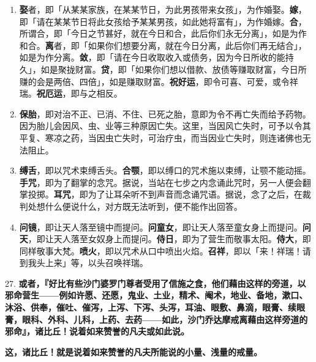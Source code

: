 \begin{enumerate}\item \textbf{娶}者，即「从某某家族，在某某节日，为此男孩带来女孩」，为作婚娶。\textbf{嫁}，即「请在某某节日将此女孩给予某某男孩，如此她将富有」，为作婚嫁。\textbf{合}，所谓合，即「今日之节甚好，就在今日和合，此后你们永无分离」，如是为作和合。\textbf{离}者，即「如果你们想要分离，就在今日分离，此后你们再无结合」，如是为作分离。\textbf{敛}，即「请在今日收取收入或债务，因为今日所收的能持久」，如是聚拢财富。\textbf{贷}，即「如果你们想以借款、放债等赚取财富，今日所赚的会是两倍、四倍」，如是赚取财富。\textbf{祝好运}，即令可喜、可爱，或令祥瑞。\textbf{祝厄运}，即与之相反。
\item \textbf{保胎}，即对治不正、已消、不住、已死之胎，意即为令不再亡失而给予药物。因为胎儿会因风、虫、业等三种原因亡失。这里，当因风亡失时，可予以令其平复、寒凉之药，当因虫亡失时，可治疗虫，而当因业亡失时，则连诸佛也无法阻止。
\item \textbf{缚舌}，即以咒术束缚舌头。\textbf{合颚}，即以缚口的咒术施以束缚，让颚不能动摇。\textbf{手咒}，即为了翻掌的念咒。据说，当站在七步之内念诵此咒时，另一人便会翻掌投掷。\textbf{耳咒}，即为了让耳朵听不到声音而念诵咒语。据说，念了之后，在裁判处想什么便说什么，对方既无法听到，便不能作出回答。
\item \textbf{问镜}，即让天人落至镜中而提问。\textbf{问童女}，即让天人落至童女身上而提问。\textbf{问天}，即让天人落至女奴身上而提问。\textbf{侍日}，即为了营生而敬事太阳。\textbf{侍大}，即同样敬事大梵。\textbf{喷火}，即以咒术从口中喷出火焰。\textbf{召祥}，即以「来！祥瑞！请到我头上来」等，以头召唤祥瑞。\end{enumerate}

{\Large 27.} \textbf{或者，『好比有些沙门婆罗门尊者受用了信施之食，他们藉由这样的旁道，以邪命营生——例如许愿、还愿，鬼业、土业，精术、阉术，地业、备地，漱口、沐浴、供奉，催吐、催泻，上泻、下泻、头泻，耳油、眼敷、鼻滴，眼膏、续眼膏，眼科、外科、儿科，上药、去药——如此，沙门乔达摩戒离藉由这样旁道的邪命』，诸比丘！说着如来赞誉的凡夫或如此说。}

\textbf{这，诸比丘！就是说着如来赞誉的凡夫所能说的小量、浅量的戒量。}

